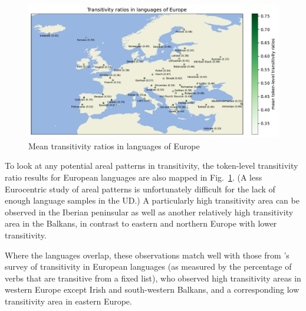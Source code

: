 \begin{figure}
  \centering
  \includegraphics[width=\textwidth]{figures/transitivity_europe.pdf}
  \caption{Mean transitivity ratios in languages of Europe}
  \label{fig:transitivity_europe}
\end{figure}

To look at any potential areal patterns in transitivity, the token-level transitivity ratio results for European languages are also mapped in Fig.~\ref{fig:transitivity_europe}. (A less Eurocentric study of areal patterns is unfortunately difficult for the lack of enough language samples in the UD.) A particularly high transitivity area can be observed in the Iberian peninsular as well as another relatively high transitivity area in the Balkans, in contrast to eastern and northern Europe with lower transitivity.

Where the languages overlap, these observations match well with those from \citet{say2014}'s survey of transitivity in European languages (as measured by the percentage of verbs that are transitive from a fixed list), who observed high transitivity areas in western Europe except Irish and south-western Balkans, and a corresponding low transitivity area in eastern Europe.



